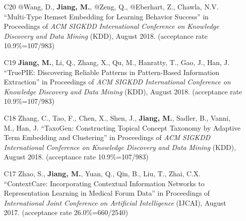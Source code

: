 \documentclass[10pt]{article}
\newenvironment{myindentpar}[1]%
{\begin{list}{}%
         {\setlength{\leftmargin}{#1}}%
         \item[]%
}
{\end{list}}
\newcounter{list}
\newcommand{\hide}[1]{}
\begin{document}
\begin{myindentpar}{0.00cm}
\begin{enumerate}[leftmargin=.5cm]
	\hide{\vspace{-0.1cm}\hspace{0.5cm}{\small \emph{I made 20\% contribution. I conceived the idea. Mr. Wang implemented the system, did the experiments, and wrote the paper.}}}

\item[C20] @Wang, D., \textbf{Jiang, M.}, @Zeng, Q., @Eberhart, Z., Chawla, N.V. ``Multi-Type Itemset Embedding for Learning Behavior Success'' in Proceedings of \emph{ACM SIGKDD International Conference on Knowledge Discovery and Data Mining} (KDD), August 2018. (acceptance rate 10.9\%=107/983)

	\hide{\vspace{-0.1cm}\hspace{0.5cm}{\small \emph{I made 70\% contribution and Mr. Wang made 20\%. I conceived the idea and designed the study. Mr. Wang implemented the system and did the experiments.}}}

\item[C19] \textbf{Jiang, M.}, Li, Q., Zhang, X., Qu, M., Hanratty, T., Gao, J., Han, J. ``TruePIE: Discovering Reliable Patterns in Pattern-Based Information Extraction'' in Proceedings of \emph{ACM SIGKDD International Conference on Knowledge Discovery and Data Mining} (KDD), August 2018. (acceptance rate 10.9\%=107/983)

	\hide{\vspace{-0.1cm}\hspace{0.5cm}{\small \emph{I made 40\% contribution and Dr. Li made 40\%. Dr. Li and I are co-first authors. I conceived the idea. Dr. Li did the experiments, and wrote the paper.}}}

\item[C18] Zhang, C., Tao, F., Chen, X., Shen, J., \textbf{Jiang, M.}, Sadler, B., Vanni, M., Han, J. ``TaxoGen: Constructing Topical Concept Taxonomy by Adaptive Term Embedding and Clustering'' in Proceedings of \emph{ACM SIGKDD International Conference on Knowledge Discovery and Data Mining} (KDD), August 2018. (acceptance rate 10.9\%=107/983)

	\hide{\vspace{-0.1cm}\hspace{0.5cm}{\small \emph{I made 3\% contribution. Mr. Zhang conceived the idea in consultation with myself. Mr. Zhang did the experiments and wrote the paper.}}}

\item[C17] Zhao, S., \textbf{Jiang, M.}, Yuan, Q., Qin, B., Liu, T., Zhai, C.X. ``ContextCare: Incorporating Contextual Information Networks to Representation Learning in Medical Forum Data'' in Proceedings of \emph{International Joint Conference on Artificial Intelligence} (IJCAI), August 2017. (acceptance rate 26.0\%=660/2540)


\end{enumerate}
\end{myindentpar}
\end{document}
